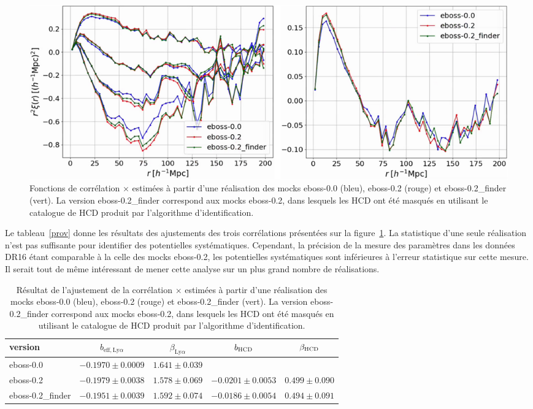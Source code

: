 \documentclass[11pt, twoside, a4paper, openright]{report}
\begin{document}
\begin{figure}
  \centering
  \includegraphics[scale=0.4]{cf_finder_vs_true}
  \caption{Fonctions de corrélation \lya{}$\times$\lya{} estimées à partir d'une réalisation des mocks eboss-0.0 (bleu), eboss-0.2 (rouge) et eboss-0.2\_finder (vert). La version eboss-0.2\_finder correspond aux mocks eboss-0.2, dans lesquels les HCD ont été masqués en utilisant le catalogue de HCD produit par l'algorithme d'identification.}
  \label{fig:cf_finder_vs_true}
\end{figure}

Le tableau~\ref{prov} donne les résultats des ajustements des trois corrélations présentées sur la figure~\ref{fig:cf_finder_vs_true}. La statistique d'une seule réalisation n'est pas suffisante pour identifier des potentielles systématiques. Cependant, la précision de la mesure des paramètres \lya{} dans les données DR16 étant comparable à la celle des mocks eboss-0.2, les potentielles systématiques sont inférieures à l'erreur statistique sur cette mesure.
Il serait tout de même intéressant de mener cette analyse sur un plus grand nombre de réalisations.


\begin{table}[]
  \centering
  \caption{Résultat de l'ajustement de la corrélation \lya{}$\times$\lya{} estimées à partir d'une réalisation des mocks eboss-0.0 (bleu), eboss-0.2 (rouge) et eboss-0.2\_finder (vert). La version eboss-0.2\_finder correspond aux mocks eboss-0.2, dans lesquels les HCD ont été masqués en utilisant le catalogue de HCD produit par l'algorithme d'identification.}
  \label{tab:finder_vs_true}
  \begin{tabular}{lcccc}
    \toprule
    version & $b_{\mathrm{eff},\mathrm{Ly}\alpha}$ & $\beta_{\mathrm{Ly}\alpha}$ & $b_{\textsc{HCD}}$ & $\beta_{\textsc{HCD}}$ \\
    \midrule
    eboss-0.0 & $-0.1970 \pm 0.0009$ & $ 1.641 \pm 0.039$ & & \\
    eboss-0.2 & $-0.1979 \pm 0.0038$ & $1.578 \pm 0.069$ & $-0.0201 \pm 0.0053$ & $0.499 \pm 0.090$ \\
    eboss-0.2\_finder & $-0.1951 \pm 0.0039$ & $1.592 \pm 0.074$ & $-0.0186 \pm 0.0054$ & $0.494 \pm 0.091$ \\
    \bottomrule
  \end{tabular}
\end{table}
\end{document}
